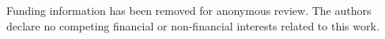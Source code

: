 Funding information has been removed for anonymous review. The authors
declare no competing financial or non-financial interests related to
this work.
